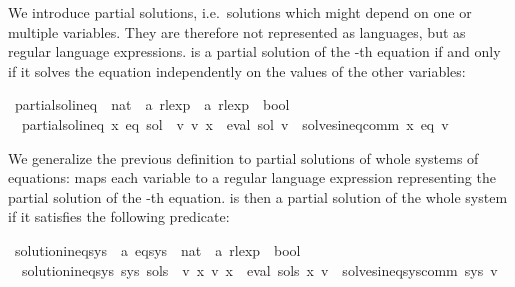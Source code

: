 \begin{isabellebody}
{}
\isamarkuptrue%
%
\endisatagdocument
{\isafolddocument}%
%
\isadelimdocument
%
\endisadelimdocument
%
\begin{isamarkuptext}%
We introduce partial solutions, i.e.\ solutions which might depend on one or multiple
variables. They are therefore not represented as languages, but as regular language expressions.
 is a partial solution of the -th equation if and only if it solves the equation
independently on the values of the other variables:%
\end{isamarkuptext}\isamarkuptrue%
\isamarkupfalse%
\ partial{\isacharunderscore}{\kern0pt}sol{\isacharunderscore}{\kern0pt}ineq\ {\isacharcolon}{\kern0pt}{\isacharcolon}{\kern0pt}\ {\isachardoublequoteopen}nat\ {\isasymRightarrow}\ {\isacharprime}{\kern0pt}a\ rlexp\ {\isasymRightarrow}\ {\isacharprime}{\kern0pt}a\ rlexp\ {\isasymRightarrow}\ bool{\isachardoublequoteclose}\ \isanewline
\ \ {\isachardoublequoteopen}partial{\isacharunderscore}{\kern0pt}sol{\isacharunderscore}{\kern0pt}ineq\ x\ eq\ sol\ {\isasymequiv}\ {\isasymforall}v{\isachardot}{\kern0pt}\ v\ x\ {\isacharequal}{\kern0pt}\ eval\ sol\ v\ {\isasymlongrightarrow}\ solves{\isacharunderscore}{\kern0pt}ineq{\isacharunderscore}{\kern0pt}comm\ x\ eq\ v{\isachardoublequoteclose}%
\begin{isamarkuptext}%
We generalize the previous definition to partial solutions of whole systems of equations:
 maps each variable  to a regular language expression representing the partial solution
of the -th equation.  is then a partial solution of the whole system if it satisfies the
following predicate:%
\end{isamarkuptext}\isamarkuptrue%
\isamarkupfalse%
\ solution{\isacharunderscore}{\kern0pt}ineq{\isacharunderscore}{\kern0pt}sys\ {\isacharcolon}{\kern0pt}{\isacharcolon}{\kern0pt}\ {\isachardoublequoteopen}{\isacharprime}{\kern0pt}a\ eq{\isacharunderscore}{\kern0pt}sys\ {\isasymRightarrow}\ {\isacharparenleft}{\kern0pt}nat\ {\isasymRightarrow}\ {\isacharprime}{\kern0pt}a\ rlexp{\isacharparenright}{\kern0pt}\ {\isasymRightarrow}\ bool{\isachardoublequoteclose}\ \isanewline
\ \ {\isachardoublequoteopen}solution{\isacharunderscore}{\kern0pt}ineq{\isacharunderscore}{\kern0pt}sys\ sys\ sols\ {\isasymequiv}\ {\isasymforall}v{\isachardot}{\kern0pt}\ {\isacharparenleft}{\kern0pt}{\isasymforall}x{\isachardot}{\kern0pt}\ v\ x\ {\isacharequal}{\kern0pt}\ eval\ {\isacharparenleft}{\kern0pt}sols\ x{\isacharparenright}{\kern0pt}\ v{\isacharparenright}{\kern0pt}\ {\isasymlongrightarrow}\ solves{\isacharunderscore}{\kern0pt}ineq{\isacharunderscore}{\kern0pt}sys{\isacharunderscore}{\kern0pt}comm\ sys\ v{\isachardoublequoteclose}%

\end{isabellebody}
